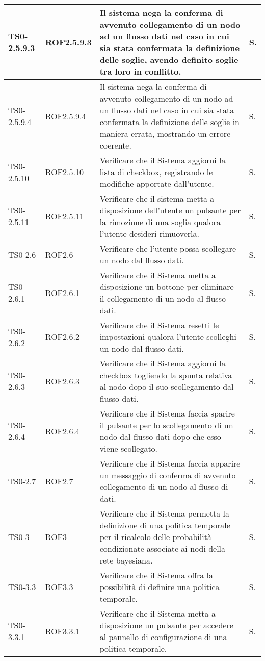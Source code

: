 \begin{longtable}{|C{.15\textwidth}|C{.14\textwidth}|m{.52\textwidth}|m{.08\textwidth}|}
TS0-2.5.9.3 & ROF2.5.9.3  & Il sistema nega la conferma di avvenuto collegamento di un nodo ad un flusso dati nel caso in cui sia stata confermata la definizione delle soglie, avendo definito soglie tra loro in conflitto. & S. \\
\hline
TS0-2.5.9.4 & ROF2.5.9.4  & Il sistema nega la conferma di avvenuto collegamento di un nodo ad un flusso dati nel caso in cui sia stata confermata la definizione delle soglie in maniera errata, mostrando un errore coerente. & S. \\
\hline
{}TS0-2.5.10 & ROF2.5.10 & Verificare che il Sistema aggiorni la lista di checkbox, registrando le modifiche apportate dall'utente. & S. \\
\hline
TS0-2.5.11 & ROF2.5.11  & Verificare che il sistema metta a disposizione dell'utente un pulsante per la rimozione di una soglia qualora l'utente desideri rimuoverla. & S. \\
\hline
{} TS0-2.6 & ROF2.6 & Verificare che l'utente possa scollegare un nodo dal flusso dati. & S. \\
\hline
TS0-2.6.1 & ROF2.6.1 & Verificare che il Sistema metta a disposizione un bottone per eliminare il collegamento di un nodo al flusso dati. & S. \\
\hline
{}TS0-2.6.2 & ROF2.6.2 & Verificare che il Sistema resetti le impostazioni qualora l'utente scolleghi un nodo dal flusso dati. & S. \\
\hline
TS0-2.6.3 & ROF2.6.3 & Verificare che il Sistema aggiorni la checkbox togliendo la spunta relativa al nodo dopo il suo scollegamento dal flusso dati. & S. \\
\hline
{}TS0-2.6.4 & ROF2.6.4 & Verificare che il Sistema faccia sparire il pulsante per lo scollegamento di un nodo dal flusso dati dopo che esso viene scollegato. & S. \\
\hline
TS0-2.7 & ROF2.7 & Verificare che il Sistema faccia apparire un messaggio di conferma di avvenuto collegamento di un nodo al flusso di dati. & S. \\
\hline
{}TS0-3 & ROF3 & Verificare che il Sistema permetta la definizione di una politica temporale per il ricalcolo delle probabilità condizionate associate ai nodi della rete bayesiana. & S. \\
\hline
TS0-3.3 & ROF3.3 & Verificare che il Sistema offra la possibilità di definire una politica temporale. & S. \\
\hline
{}TS0-3.3.1 & ROF3.3.1 & Verificare che il Sistema metta a disposizione un pulsante per accedere al pannello di configurazione di una politica temporale. & S. \\

\end{longtable}
